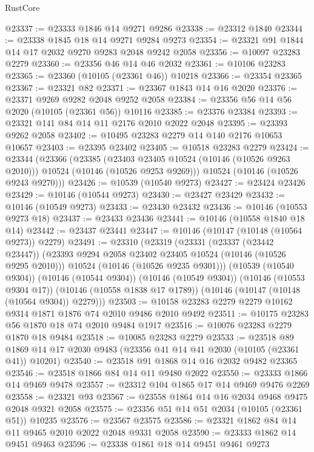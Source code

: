 \begin{lexlean}{RustCore}
\begin{coremodule}
@23337 := @23333 @1846 @14 @9271 @9286
@23338 := @23312 @1840
@23344 := @23338 @1845 @18 @14 @9271 @9284 @9273
@23354 := @23321 @91 @1844 @14 @17 @2032 @9270 @9283 @2048 @9242 @2058
@23356 := @10097 @23283 @2279
@23360 := @23356 @46 @14 @46 @2032
@23361 := @10106 @23283
@23365 := @23360 (@10105 (@23361 @46)) @10218
@23366 := @23354 @23365
@23367 := @23321 @82
@23371 := @23367 @1843 @14 @16 @2020
@23376 := @23371 @9269 @9282 @2048 @9252 @2058
@23384 := @23356 @56 @14 @56 @2020 (@10105 (@23361 @56)) @10116
@23385 := @23376 @23384
@23393 := @23321 @141 @84 @14 @11 @2176 @2010 @2022 @2048
@23395 := @23393 @9262 @2058
@23402 := @10495 @23283 @2279 @14 @140 @2176 @10653 @10657
@23403 := @23395 @23402
@23405 := @10518 @23283 @2279
@23424 := @23344
    (@23366
      (@23385
        (@23403 @23405 @10524 (@10146 (@10526 @9263 @2010)))
        @10524
        (@10146 (@10526 @9253 @9269)))
      @10524
      (@10146 (@10526 @9243 @9270)))
@23426 := @10539 (@10540 @9273)
@23427 := @23424 @23426
@23429 := @10146 (@10544 @9273)
@23430 := @23427 @23429
@23432 := @10146 (@10549 @9273)
@23433 := @23430 @23432
@23436 := @10146 (@10553 @9273 @18)
@23437 := @23433 @23436
@23441 := @10146 (@10558 @1840 @18 @14)
@23442 := @23437 @23441
@23447 := @10146 (@10147 (@10148 (@10564 @9273)) @2279)
@23491 := @23310
    (@23319
      (@23331
        (@23337 (@23442 @23447))
        (@23393 @9294 @2058 @23402 @23405 @10524 (@10146 (@10526 @9295 @2010)))
        @10524
        (@10146 (@10526 @9235 @9301)))
      (@10539 (@10540 @9304))
      (@10146 (@10544 @9304))
      (@10146 (@10549 @9304))
      (@10146 (@10553 @9304 @17))
      (@10146 (@10558 @1838 @17 @1789))
      (@10146 (@10147 (@10148 (@10564 @9304)) @2279)))
@23503 := @10158 @23283 @2279 @2279 @10162 @9314 @1871 @1876 @74 @2010 @9486 @2010 @9492
@23511 := @10175 @23283 @56 @1870 @18 @74 @2010 @9484 @1917
@23516 := @10076 @23283 @2279 @1870 @18 @9484
@23518 := @10085 @23283 @2279
@23533 := @23518
    @89
    @1869
    @14
    @17
    @2030
    @9483
    (@23356 @41 @14 @41 @2030 (@10105 (@23361 @41)) @10201)
@23540 := @23518 @91 @1868 @14 @16 @2032 @9482 @23365
@23546 := @23518 @1866 @84 @14 @11 @9480 @2022
@23550 := @23333 @1866 @14 @9469 @9478
@23557 := @23312 @104 @1865 @17 @14 @9469 @9476 @2269
@23558 := @23321 @93
@23567 := @23558 @1864 @14 @16 @2034 @9468 @9475 @2048 @9321 @2058
@23575 := @23356 @51 @14 @51 @2034 (@10105 (@23361 @51)) @10235
@23576 := @23567 @23575
@23586 := @23321 @1862 @84 @14 @11 @9465 @2010 @2022 @2048 @9331 @2058
@23590 := @23333 @1862 @14 @9451 @9463
@23596 := @23338 @1861 @18 @14 @9451 @9461 @9273

\end{coremodule}
\end{lexlean}

